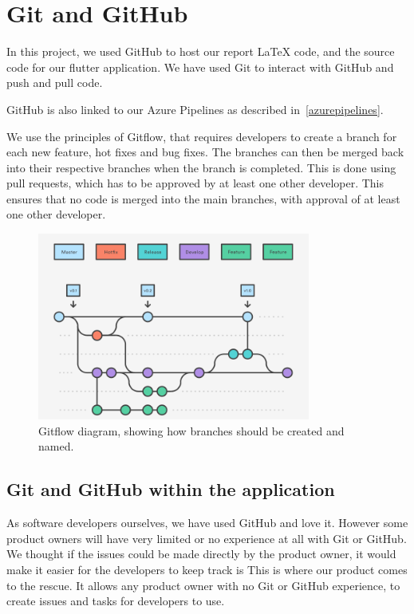 \section{Git and GitHub}
In this project, we used GitHub to host our report LaTeX code, and the source code for our flutter application.
We have used Git to interact with GitHub and push and pull code. 

GitHub is also linked to our Azure Pipelines as described in~\autoref{azurepipelines}.

We use the principles of Gitflow, that requires developers to create a branch for each new feature, hot fixes and bug fixes. 
The branches can then be merged back into their respective branches when the branch is completed.
This is done using pull requests, which has to be approved by at least one other developer.
This ensures that no code is merged into the main branches, with approval of at least one other developer.

\begin{figure}[H]
    \centering
    \includegraphics[width=0.8\textwidth]{images/GitFlow.png}
    \caption{Gitflow diagram, showing how branches should be created and named.}
    \label{Gitflow}
\end{figure}


\subsection{Git and GitHub within the application}
As software developers ourselves, we have used GitHub and love it.
However some product owners will have very limited or no experience at all with Git or GitHub.
We thought if the issues could be made directly by the product owner, it would make it easier for the developers to keep track is
This is where our product comes to the rescue.
It allows any product owner with no Git or GitHub experience, to create issues and tasks for developers to use.